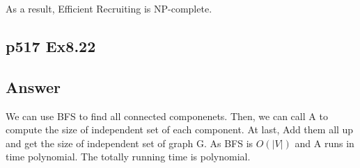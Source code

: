 \documentclass[a4paper]{article}
\begin{document}
As a result, Efficient Recruiting is NP-complete.
\vspace{2cm}



\subsection*{p517 Ex8.22}
\subsection*{Answer}
We can use BFS to find all connected componenets. Then, we can call A to compute the size of independent set of each component. At last, Add them all up and get the size of independent set of graph G. As BFS is $O(|V|)$ and A runs in time polynomial. The totally running time is polynomial.


%	

\end{document}
